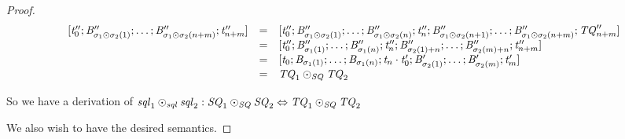 \documentclass[numbers]{sigplanconf}
\begin{document}
\begin{proof}
  \[
    \begin{array}{rcl}
      [\mathit{t}_0'';\mathit{B}_{\sigma_1\odot\sigma_2(1)}'';\ldots;
      \mathit{B}_{\sigma_1\odot\sigma_2(n+m)}'';\mathit{t}_{n+m}'']
      & = &
            [\mathit{t}_0'';\mathit{B}_{\sigma_1\odot\sigma_2(1)}'';
            \ldots;\mathit{B}_{\sigma_1\odot\sigma_2(n)}'';
            \mathit{t}_n'';\mathit{B}_{\sigma_1\odot\sigma_2(n+1)}'';
            \ldots;
            \mathit{B}_{\sigma_1\odot\sigma_2(n+m)}'';\mathit{TQ}_{n+m}'']\\
      & = &
            [\mathit{t}_0'';\mathit{B}_{\sigma_1(1)}'';
            \ldots;\mathit{B}_{\sigma_1(n)}'';
            \mathit{t}_n'';\mathit{B}_{\sigma_2(1)+n}'';
            \ldots;
            \mathit{B}_{\sigma_2(m)+n}'';\mathit{t}_{n+m}'']\\
      & = &
            [\mathit{t}_0;\mathit{B}_{\sigma_1(1)};
            \ldots;\mathit{B}_{\sigma_1(n)};
            \mathit{t}_n\cdot\mathit{t}_0';\mathit{B}_{\sigma_2(1)}';
            \ldots;
            \mathit{B}_{\sigma_2(m)}';\mathit{t}_m']\\
      & = & \mathit{TQ}_1\odot_{\mathit{SQ}}\mathit{TQ}_2
    \end{array}
  \]

  So we have a derivation of $\mathit{sql}_1\odot_{\mathit{sql}}\mathit{sql}_2 :
  \mathit{SQ}_1\odot_{\mathit{SQ}}\mathit{SQ}_2 \Leftrightarrow
  \mathit{TQ}_1\odot_{\mathit{SQ}}\mathit{TQ}_2$
  
  We also wish to have the desired semantics.


\end{proof}
\end{document}
